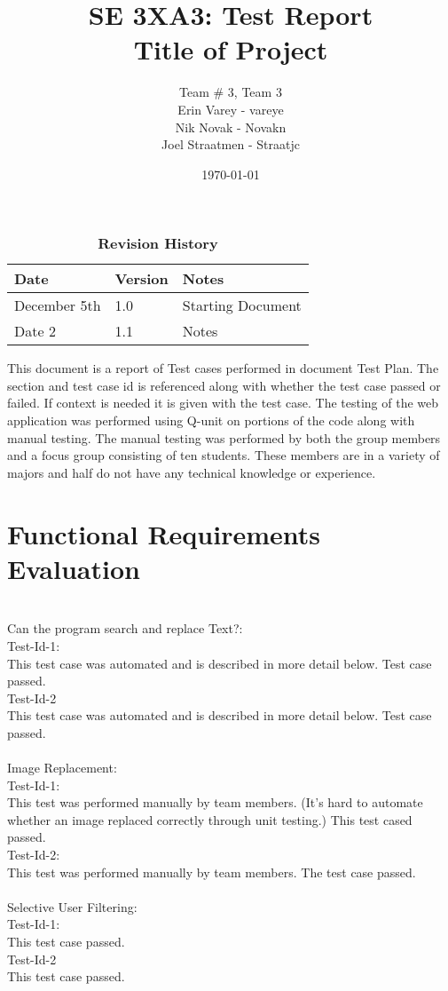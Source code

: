\documentclass[12pt, titlepage]{article}
\title{SE 3XA3: Test Report\\Title of Project}
\author{Team \# 3, Team 3
		\\ Erin Varey - vareye
		\\ Nik Novak - Novakn
		\\ Joel Straatmen - Straatjc
}
\date{\today}
\begin{document}
\maketitle
{}
\tableofcontents
\listoftables
\listoffigures
\begin{table}[bp]
\caption{\bf Revision History}
\begin{tabularx}{\textwidth}{p{3cm}p{2cm}X}
\toprule {\bf Date} & {\bf Version} & {\bf Notes}\\
\midrule
December 5th & 1.0 & Starting Document\\
Date 2 & 1.1 & Notes\\
\bottomrule
\end{tabularx}
\end{table}
\newpage
{}
This document is a report of Test cases performed in document Test Plan. The section and test case id is referenced along with whether the test case passed or failed. If context is needed it is given with the test case. The testing of the web application was performed using Q-unit on portions of the code along with manual testing. The manual testing was performed by both the group members and a focus group consisting of ten students. These members are in a variety of majors and half do not have any technical knowledge or experience.
\section{Functional Requirements Evaluation}
\\
Can the program search and replace Text?: \\
Test-Id-1:\\
This test case was automated and is described in more detail below. Test case passed.\\
Test-Id-2\\
This test case was automated and is described in more detail below. Test case passed.
\\
\\
Image Replacement: \\
Test-Id-1: \\
This test was performed manually by team members. (It's hard to automate whether an image replaced correctly through unit testing.) This test cased passed.\\
Test-Id-2:\\
This test was performed manually by team members. The test case passed.\\
\\
Selective User Filtering: \\
Test-Id-1: \\
This test case passed. \\
Test-Id-2 \\
This test case passed. \\
\\
\end{document}
